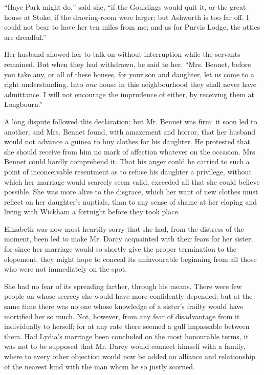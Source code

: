 \documentclass[12pt]{book}
\begin{document}
``Haye Park might do,'' said she, ``if the Gouldings would quit it, or the great house at Stoke, if the drawing-room were larger; but Ashworth is too far off. I could not bear to have her ten miles from me; and as for Purvis Lodge, the attics are dreadful.''

Her husband allowed her to talk on without interruption while the servants remained. But when they had withdrawn, he said to her, ``Mrs. Bennet, before you take any, or all of these houses, for your son and daughter, let us come to a right understanding. Into \textit{one} house in this neighbourhood they shall never have admittance. I will not encourage the imprudence of either, by receiving them at Longbourn.''

A long dispute followed this declaration; but Mr. Bennet was firm: it soon led to another; and Mrs. Bennet found, with amazement and horror, that her husband would not advance a guinea to buy clothes for his daughter. He protested that she should receive from him no mark of affection whatever on the occasion. Mrs. Bennet could hardly comprehend it. That his anger could be carried to such a point of inconceivable resentment as to refuse his daughter a privilege, without which her marriage would scarcely seem valid, exceeded all that she could believe possible. She was more alive to the disgrace, which her want of new clothes must reflect on her daughter's nuptials, than to any sense of shame at her eloping and living with Wickham a fortnight before they took place.

Elizabeth was now most heartily sorry that she had, from the distress of the moment, been led to make Mr. Darcy acquainted with their fears for her sister; for since her marriage would so shortly give the proper termination to the elopement, they might hope to conceal its unfavourable beginning from all those who were not immediately on the spot.

She had no fear of its spreading farther, through his means. There were few people on whose secrecy she would have more confidently depended; but at the same time there was no one whose knowledge of a sister's frailty would have mortified her so much. Not, however, from any fear of disadvantage from it individually to herself; for at any rate there seemed a gulf impassable between them. Had Lydia's marriage been concluded on the most honourable terms, it was not to be supposed that Mr. Darcy would connect himself with a family, where to every other objection would now be added an alliance and relationship of the nearest kind with the man whom he so justly scorned.
\end{document}
